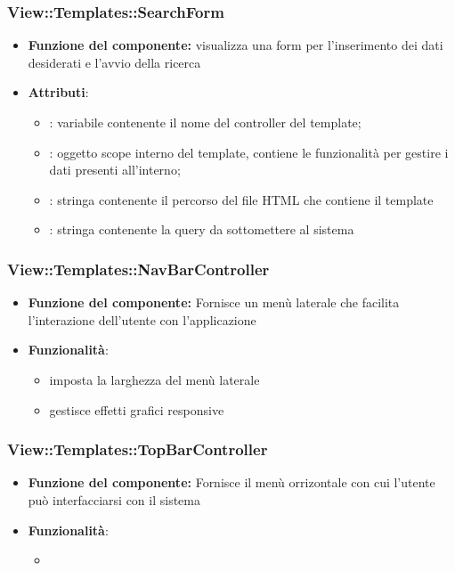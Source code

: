  \subsubsection{View::Templates::SearchForm}
 \begin{itemize}
 \item\textbf{Funzione del componente:} visualizza una form per l’inserimento dei dati desiderati e
l’avvio della ricerca
 \item\textbf{Attributi}:
 	\begin{itemize}
 		\item{}: variabile contenente il nome del controller del template;\\
		\item{}: oggetto scope interno del template, contiene le funzionalità per gestire i dati presenti all’interno;\\
		\item{}: stringa contenente il percorso del file HTML che contiene il template\\
		\item{}: stringa contenente la query da sottomettere al sistema\\
 	\end{itemize}
 \end{itemize}
 
 \subsubsection{View::Templates::NavBarController}
 \begin{itemize}
 \item\textbf{Funzione del componente:} Fornisce un menù laterale che facilita l'interazione dell'utente con l'applicazione
 \item\textbf{Funzionalità}:
 	\begin{itemize}
 		\item{} imposta la larghezza del menù laterale\\
		\item{} gestisce effetti grafici responsive\\
 	\end{itemize}
 \end{itemize}
 
 \subsubsection{View::Templates::TopBarController}
 \begin{itemize}
 \item\textbf{Funzione del componente:} Fornisce il menù orrizontale con cui l'utente può interfacciarsi con il sistema
 \item\textbf{Funzionalità}:
 	\begin{itemize}
 		\item\code{+ :}\\
 	\end{itemize}
 \end{itemize}